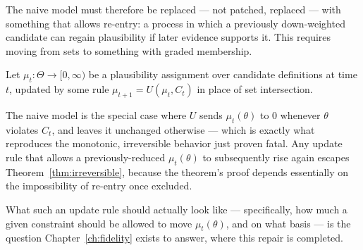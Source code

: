 The naive model must therefore be replaced --- not patched, replaced --- with something that allows re-entry: a process in which a previously down-weighted candidate can regain plausibility if later evidence supports it. This requires moving from sets to something with graded membership.

\begin{repairbox}
\begin{definition}
Let $\mu_t : \Theta \to [0,\infty)$ be a plausibility assignment over candidate definitions at time $t$, updated by some rule $\mu_{t+1} = U(\mu_t, C_t)$ in place of set intersection.
\end{definition}

The naive model is the special case where $U$ sends $\mu_t(\theta)$ to $0$ whenever $\theta$ violates $C_t$, and leaves it unchanged otherwise --- which is exactly what reproduces the monotonic, irreversible behavior just proven fatal. Any update rule that allows a previously-reduced $\mu_t(\theta)$ to subsequently rise again escapes Theorem~\ref{thm:irreversible}, because the theorem's proof depends essentially on the impossibility of re-entry once excluded.

What such an update rule should actually look like --- specifically, how much a given constraint should be allowed to move $\mu_t(\theta)$, and on what basis --- is the question Chapter~\ref{ch:fidelity} exists to answer, where this repair is completed.
\end{repairbox}
